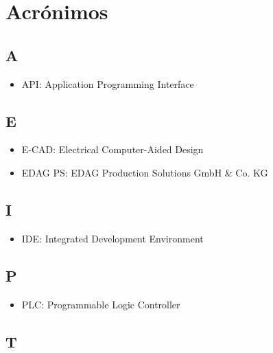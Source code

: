 \documentclass[
	spanish, %
	letterpaper, oneside, openany
]{book}
\begin{document}
\clearpage
{}
{}

\chapter*{Acrónimos}

\section*{A}

\begin{itemize}

    \item API: Application Programming Interface

\end{itemize}


\section*{E}

\begin{itemize}

    \item E-CAD: Electrical Computer-Aided Design
    \item EDAG PS: EDAG Production Solutions GmbH \& Co. KG

\end{itemize}


\section*{I}

\begin{itemize}

    \item IDE: Integrated Development Environment
    

\end{itemize}


\section*{P}

\begin{itemize}

    \item PLC: Programmable Logic Controller

\end{itemize}


\section*{T}
\end{document}
